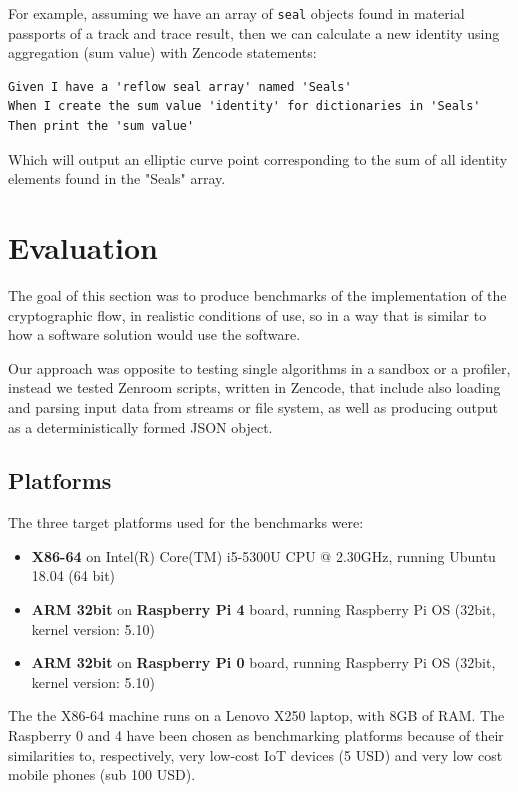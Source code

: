 \documentclass[twocolumn]{article}
\begin{document}
For example, assuming we have an array of \verb!seal! objects found in
material passports of a track and trace result, then we can calculate
a new identity using aggregation (sum value) with Zencode statements:


\begin{lstlisting}[style=zencode,caption={Aggregate reflow seal identity}]
Given I have a 'reflow seal array' named 'Seals'
When I create the sum value 'identity' for dictionaries in 'Seals'
Then print the 'sum value'
\end{lstlisting}

Which will output an elliptic curve point corresponding to the sum of
all identity elements found in the "Seals" array.

\twocolumn

\section{Evaluation}
\label{sec:evaluation}



The goal of this section was to produce benchmarks of the implementation of the cryptographic flow, in  realistic conditions of use, so in a way that is similar to how a software solution would use the software. 

Our approach was opposite to testing single algorithms in a sandbox or a profiler, instead we tested Zenroom scripts, written in Zencode, that include also loading and parsing input data from streams or file system, as well as producing output as a deterministically formed JSON object. 

\subsection*{Platforms}
The three target platforms used for the benchmarks were: 
\begin{itemize}
  \item   \textbf{X86-64} on Intel(R) Core(TM) i5-5300U CPU @ 2.30GHz, running Ubuntu 18.04 (64 bit)
  \item   \textbf{ARM 32bit} on \textbf{Raspberry Pi 4} board, running Raspberry Pi OS (32bit, kernel version: 5.10)
  \item  \textbf{ARM 32bit} on \textbf{Raspberry Pi 0} board, running Raspberry Pi OS (32bit, kernel version: 5.10)
\end{itemize}

The the X86-64 machine runs on a Lenovo X250 laptop, with 8GB of RAM.  
The Raspberry 0 and 4 have been chosen as benchmarking platforms because of their similarities to, respectively, very low-cost IoT devices (5 USD) and very low cost mobile phones (sub 100 USD).
\end{document}

